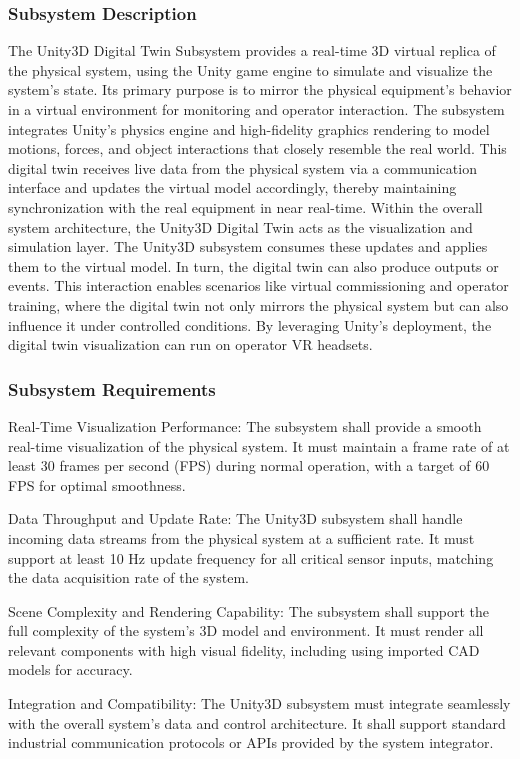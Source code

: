 \documentclass{senior-design}
\begin{document}
\subsubsection*{Subsystem Description}
The Unity3D Digital Twin Subsystem provides a real-time 3D virtual replica of 
the physical system, using the Unity game engine to simulate and visualize the 
system's state. Its primary purpose is to mirror the physical equipment's 
behavior in a virtual environment for monitoring and operator interaction. 
The subsystem integrates Unity's physics engine and high-fidelity graphics 
rendering to model motions, forces, and object interactions that closely 
resemble the real world​. This digital twin receives live data from the physical 
system via a communication interface and updates the virtual model accordingly, 
thereby maintaining synchronization with the real equipment in near real-time. 
Within the overall system architecture, the Unity3D Digital Twin acts as the 
visualization and simulation layer. The Unity3D subsystem consumes these updates 
and applies them to the virtual model. In turn, the digital twin can also produce 
outputs or events​. This interaction enables scenarios like virtual commissioning 
and operator training, where the digital twin not only mirrors the physical 
system but can also influence it under controlled conditions. By leveraging 
Unity’s deployment, the digital twin visualization can run on operator VR 
headsets. 
\subsubsection*{Subsystem Requirements}
Real-Time Visualization Performance: The subsystem shall provide a smooth 
real-time visualization of the physical system. It must maintain a frame rate 
of at least 30 frames per second (FPS) during normal operation, with a target 
of 60 FPS for optimal smoothness.
  
Data Throughput and Update Rate: The Unity3D subsystem shall handle incoming 
data streams from the physical system at a sufficient rate. It must support at 
least 10 Hz update frequency for all critical sensor inputs, matching the data 
acquisition rate of the system​. 
  
Scene Complexity and Rendering Capability: The subsystem shall support the full 
complexity of the system's 3D model and environment. It must render all relevant 
components with high visual fidelity, including using imported CAD models for 
accuracy​. 
  
Integration and Compatibility: The Unity3D subsystem must integrate seamlessly 
with the overall system's data and control architecture. It shall support 
standard industrial communication protocols or APIs provided by the system 
integrator. 
\end{document}
